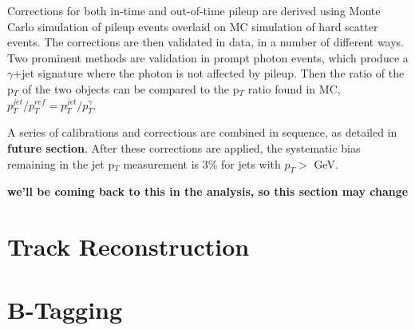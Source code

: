 Corrections for both in-time and out-of-time pileup are derived using Monte Carlo simulation of pileup events overlaid on MC simulation of hard scatter events.  The corrections are then validated in data, in a number of different ways.  Two prominent methods are validation in prompt photon events, which produce a $\gamma$+jet signature where the photon is not affected by pileup.  Then the ratio of the p$_T$ of the two objects can be compared to the p$_T$ ratio found in MC, $p^{jet}_T/p^{ref}_T = p^{jet}_T/p^{\gamma}_T$.

A series of calibrations and corrections are combined in sequence, as detailed in \textbf{future section}.  After these corrections are applied, the systematic bias remaining in the jet p$_T$ measurement is 3\% for jets with $p_T>$ GeV.

\textbf{we'll be coming back to this in the analysis, so this section may change}


\section{Track Reconstruction}


\section{B-Tagging}














